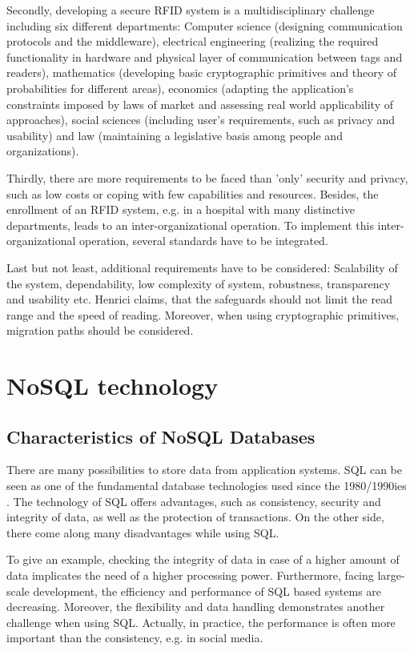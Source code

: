 Secondly, developing a secure RFID system is a multidisciplinary challenge \cite{henrici} including six different departments: Computer science (designing communication protocols and the middleware), electrical engineering (realizing the required functionality in hardware and physical layer of communication between tags and readers), mathematics (developing basic cryptographic primitives and theory of probabilities for different areas), economics (adapting the application's constraints imposed by laws of market and assessing real world applicability of approaches), social sciences (including user's requirements, such as privacy and usability) and law (maintaining a legislative basis among people and organizations).

Thirdly, there are more requirements to be faced than 'only' security and privacy, such as low costs or coping with few capabilities and resources. Besides, the enrollment of an RFID system, e.g. in a hospital with many distinctive departments, leads to an inter-organizational operation. To implement this inter-organizational operation, several standards have to be integrated. 

Last but not least, additional requirements have to be considered: Scalability of the system, dependability, low complexity of system, robustness, transparency and usability etc. Henrici claims, that the safeguards should not limit the read range and the speed of reading. Moreover, when using cryptographic primitives, migration paths should be considered.  

\section{NoSQL technology} \label{nosql}

\subsection{Characteristics of NoSQL Databases}

There are many possibilities to store data from application systems. \ac{SQL} can be seen as one of the fundamental database technologies used since the 1980/1990ies \cite[p.137 ff.]{nosql_meier}. The technology of SQL offers advantages, such as consistency, security and integrity of data, as well as the protection of transactions. On the other side, there come along many disadvantages while using SQL. 

To give an example, checking the integrity of data in case of a higher amount of data implicates the need of a higher processing power. Furthermore, facing large-scale development, the efficiency and performance of SQL based systems are decreasing. Moreover, the flexibility and data handling demonstrates another challenge when using SQL. Actually, in practice, the performance is often more important than the consistency, e.g. in social media.    

